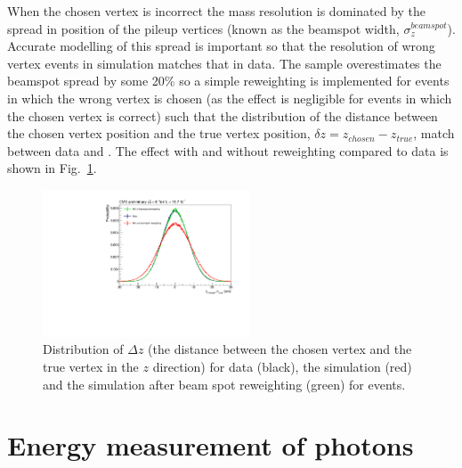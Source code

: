 When the chosen vertex is incorrect the mass resolution is dominated by the spread in position of the pileup vertices (known as the beamspot width, $\sigma_{z}^{beamspot}$). Accurate modelling of this spread is important so that the resolution of wrong vertex events in simulation matches that in data. The \MC sample overestimates the beamspot spread by some 20\% so a simple reweighting is implemented for \MC events in which the wrong vertex is chosen (as the effect is negligible for events in which the chosen vertex is correct) such that the distribution of the distance between the chosen vertex position and the true vertex position, $\delta z=z_{chosen}-z_{true}$, match between data and \MC. The effect with and without reweighting compared to data is shown in Fig.~\ref{fig:beamspot}.

\begin{figure}
  \begin{center}
  \includegraphics[width=0.55\textwidth]{analysis_comps/plots/beamspot.pdf}
  \caption[Distribution of $\Delta z$ (the distance between the chosen vertex and the true vertex in the $z$ direction)]{Distribution of $\Delta z$ (the distance between the chosen vertex and the true vertex in the $z$ direction) for data (black), the \MC simulation (red) and the \MC simulation after beam spot reweighting (green) for \Zmumu events.}
  \label{fig:beamspot}
  \end{center}
\end{figure}

\section{Energy measurement of photons}
\label{sec:photon_energy}

